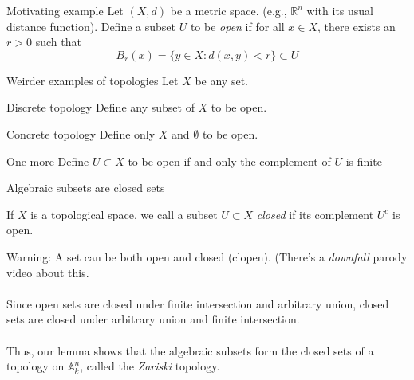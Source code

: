 \documentclass{beamer}
\newcommand{\AAA}{\mathbb{A}}
\newcommand{\R}{\mathbb{R}}
\begin{document}
\begin{frame}{Motivating example}
Let $(X,d)$ be a metric space.  (e.g., $\R^n$ with its usual distance function).
Define a subset $U$ to be \emph{open} if for all $x\in X$, there exists an $r>0$ such that
$$B_r(x)=\{y\in X : d(x,y)<r\}\subset U$$



\end{frame}

\begin{frame}{Weirder examples of topologies}
Let $X$ be any set.  

\begin{block}{Discrete topology}
Define any subset of $X$ to be open.
\end{block}
\begin{block}{Concrete topology}
Define only $X$ and $\emptyset$ to be open.
\end{block}

\begin{block}{One more}
Define $U\subset X$ to be open if and only the complement of $U$ is finite
\end{block}

\end{frame}

\begin{frame}{Algebraic subsets are closed sets}
\begin{definition}
If $X$ is a topological space, we call a subset $U\subset X$ \emph{closed} if its complement $U^c$ is open.
\end{definition}
\alert{Warning:} A set can be both open and closed (clopen).  (There's a \emph{downfall} parody video about this.
\\~\\
Since open sets are closed under finite intersection and arbitrary union, closed sets are closed under arbitrary union and finite intersection.
\\~\\
Thus, our lemma shows that the algebraic subsets form the closed sets of a topology on $\AAA_k^n$, called the \emph{Zariski} topology.


\end{frame}
\end{document}
